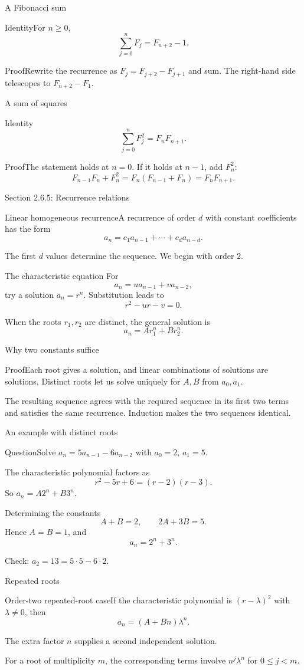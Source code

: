 \documentclass[aspectratio=169,11pt]{beamer}
\newcommand{\Def}[2]{\begin{block}{#1}#2\end{block}}
\newcommand{\Thm}[2]{\begin{block}{#1}#2\end{block}}
\renewcommand{\Proof}[1]{\begin{block}{Proof}\normalsize #1\end{block}}
\newcommand{\Question}[1]{\begin{block}{Question}#1\end{block}}
\newcommand{\gap}{\par\medskip}
\begin{document}
\begin{frame}{A Fibonacci sum}
\large
\Thm{Identity}{For $n\geq0$,
\[\sum_{j=0}^nF_j=F_{n+2}-1.\]}
\Proof{Rewrite the recurrence as $F_j=F_{j+2}-F_{j+1}$ and sum. The right-hand side telescopes to $F_{n+2}-F_1$.}
\end{frame}
\begin{frame}{A sum of squares}
\large
\Thm{Identity}{\[\sum_{j=0}^nF_j^2=F_nF_{n+1}.\]}
\Proof{The statement holds at $n=0$. If it holds at $n-1$, add $F_n^2$:
\[F_{n-1}F_n+F_n^2=F_n(F_{n-1}+F_n)=F_nF_{n+1}.\]}
\end{frame}
\begin{frame}{Section 2.6.5: Recurrence relations}
\large
\Def{Linear homogeneous recurrence}{A recurrence of order $d$ with constant coefficients has the form
\[a_n=c_1a_{n-1}+\cdots+c_da_{n-d}.\]}
\gap The first $d$ values determine the sequence. We begin with order $2$.
\end{frame}
\begin{frame}{The characteristic equation}
\large
For
\[a_n=ua_{n-1}+va_{n-2},\]
try a solution $a_n=r^n$. Substitution leads to
\[r^2-ur-v=0.\]
\gap When the roots $r_1,r_2$ are distinct, the general solution is
\[a_n=Ar_1^n+Br_2^n.\]
\end{frame}
\begin{frame}{Why two constants suffice}
\large
\Proof{Each root gives a solution, and linear combinations of solutions are solutions. Distinct roots let us solve uniquely for $A,B$ from $a_0,a_1$.\gap The resulting sequence agrees with the required sequence in its first two terms and satisfies the same recurrence. Induction makes the two sequences identical.}
\end{frame}
\begin{frame}{An example with distinct roots}
\large
\Question{Solve $a_n=5a_{n-1}-6a_{n-2}$ with $a_0=2$, $a_1=5$.}
\gap The characteristic polynomial factors as
\[r^2-5r+6=(r-2)(r-3).\]
So $a_n=A2^n+B3^n$.
\end{frame}
\begin{frame}{Determining the constants}
\large
\[A+B=2,\qquad2A+3B=5.\]
Hence $A=B=1$, and
\[a_n=2^n+3^n.\]
\gap Check: $a_2=13=5\cdot5-6\cdot2$.
\end{frame}
\begin{frame}{Repeated roots}
\large
\Thm{Order-two repeated-root case}{If the characteristic polynomial is $(r-\lambda)^2$ with $\lambda\ne0$, then
\[a_n=(A+Bn)\lambda^n.\]}
\gap The extra factor $n$ supplies a second independent solution.
\gap For a root of multiplicity $m$, the corresponding terms involve $n^j\lambda^n$ for $0\leq j<m$.
\end{frame}
\end{document}
